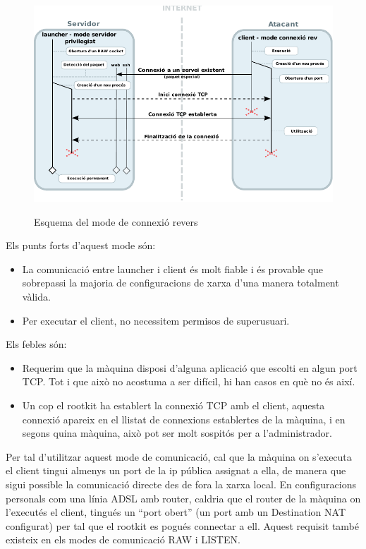 \begin{figure}[htp]
    \centering
    \includegraphics[scale=1.2,keepaspectratio]{diagrames/solutionDesignPrivilegedServerModeREV.pdf} \\
    \caption{Esquema del mode de connexió revers}
    \label{fig:modePrivilegedServerREV}
\end{figure}

Els punts forts d'aquest mode són: \\
\begin{itemize}
    \item La comunicació entre launcher i client és molt fiable i és provable que sobrepassi la majoria de 
        configuracions de xarxa d'una manera totalment vàlida.
    \item Per executar el client, no necessitem permisos de superusuari. \\
\end{itemize}

Els febles són: \\
\begin{itemize}
    \item Requerim que la màquina disposi d'alguna aplicació que escolti en algun port 
        TCP. Tot i que això no acostuma a ser difícil, hi han casos en què no és així.
    \item Un cop el rootkit ha establert la connexió TCP amb el client, aquesta connexió
        apareix en el llistat de connexions establertes de la màquina, i en segons quina màquina, això
        pot ser molt sospitós per a l'administrador. \\
\end{itemize}

Per tal d'utilitzar aquest mode de comunicació, cal que la màquina on s'executa el client tingui almenys
un port de la ip pública assignat a ella, de manera que sigui possible la comunicació directe des de fora
la xarxa local. En configuracions personals com una línia ADSL amb router, caldria que el router de la màquina
on l'executés el client, tingués un ``port obert'' (un port amb un Destination NAT configurat) per tal que el rootkit es pogués 
connectar a ell. Aquest requisit també existeix en els modes de comunicació RAW i LISTEN. \\

